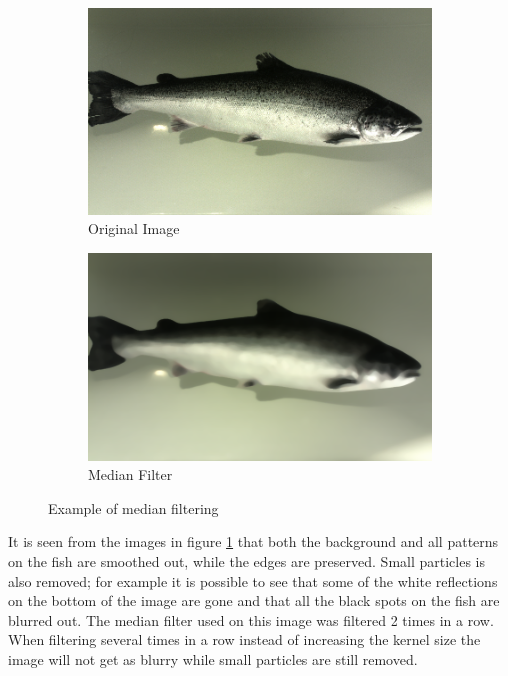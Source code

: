 \begin{figure}[h]
    \centering
    \begin{subfigure}{0.5\textwidth}
        \centering
        \includegraphics[width=.99\linewidth]{images/literature/filtering/original_fish}
        \caption{Original Image}
    \end{subfigure}%
    \begin{subfigure}{.5\textwidth}
        \centering
        \includegraphics[width=.99\linewidth]{images/literature/filtering/median}
        \caption{Median Filter}
    \end{subfigure}
    \caption{Example of median filtering}
    \label{fig:median_filter}
\end{figure}

It is seen from the images in figure \ref{fig:median_filter} that both the background and all patterns on the fish are smoothed out, while the edges are preserved. Small particles is also removed; for example it is possible to see that some of the white reflections on the bottom of the image are gone and that all the black spots on the fish are blurred out. 
The median filter used on this image was filtered 2 times in a row. When filtering several times in a row instead of increasing the kernel size the image will not get as blurry while small particles are still removed.


